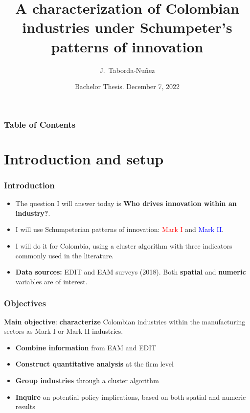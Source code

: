 \documentclass{beamer}
\begin{document}
	\title[J.S Industry Characterization]{
	\textbf{A characterization of Colombian industries under Schumpeter's patterns of innovation}
	}   
	\date[BA 2022-30]{Bachelor Thesis. December 7, 2022} 
	\author[Taborda-Nuñez]{J.~Taborda-Nuñez}
	\begin{frame} 
		\titlepage 
	\end{frame}  

	\begin{frame}
		\frametitle{Table of Contents}
		\tableofcontents
	\end{frame}


	\AtBeginSection[]
	{
		\begin{frame}
			\frametitle{Table of Contents}
			\tableofcontents[currentsection]
		\end{frame}
	}
	
\section{Introduction and setup}
	\begin{frame}[allowframebreaks]
		\frametitle{Introduction} 
		\begin{itemize}
			\item The question I will answer today is \textbf{Who drives innovation within an industry?}.
			\item I will use Schumpeterian patterns of innovation: \textcolor{red}{Mark I} and \textcolor{blue}{Mark II}.
			\item I will do it for Colombia, using a cluster algorithm with three indicators commonly used in the literature.
			\item \textbf{Data sources:} EDIT and EAM surveys (2018). Both \textbf{spatial} and \textbf{numeric} variables are of interest.
		\end{itemize}
	\end{frame}	
	\begin{frame}
		\frametitle{Objectives}
		\textbf{Main objective}: \textbf{characterize} Colombian industries within the manufacturing sectors as Mark I or Mark II industries.
		\begin{itemize}
			\item \textbf{Combine information} from EAM and EDIT
			\item \textbf{Construct quantitative analysis} at the firm level
			\item \textbf{Group industries} through a cluster algorithm
			\item \textbf{Inquire} on potential policy implications, based on both spatial and numeric results
		\end{itemize}
	\end{frame}
\end{document}
